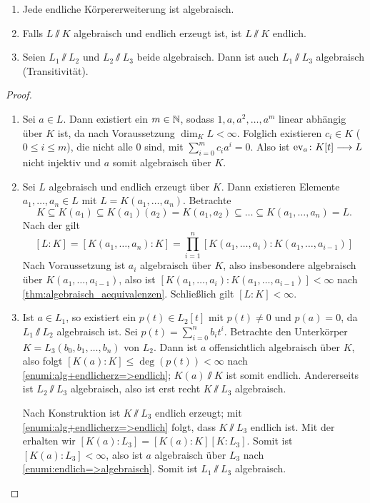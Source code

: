 \documentclass[12pt,a4paper]{scrartcl}
\begin{document}
\begin{satz}\label{thm:algebraischekes}
	\leavevmode
	\begin{enumerate}
		\item Jede endliche Körpererweiterung ist algebraisch.\label{enumi:endlich=>algebraisch}
		\item Falls $L\sslash K$ algebraisch und endlich erzeugt ist, ist $L\sslash K$ endlich.\label{enumi:alg+endlicherz=>endlich}
		\item Seien $L_1\sslash L_2$ und $L_2\sslash L_3$ beide algebraisch. Dann ist auch $L_1\sslash L_3$ algebraisch \textup(Transitivität\textup).
	\end{enumerate}
\end{satz}
\begin{proof}
	\leavevmode
	\begin{enumerate}
		\item Sei $a\in L$. Dann existiert ein $m\in \mathbb N$, sodass $1, a, a^2, \dots, a^m$ linear abhängig über $K$ ist, da nach Voraussetzung $\dim_KL<\infty$. Folglich existieren $c_i\in K$ ($0\leq i \leq m$), die nicht alle $0$ sind, mit
		$\sum_{i=0}^mc_ia^i = 0$. Also ist $\operatorname{ev}_a\colon K[t]\longrightarrow L$ nicht injektiv und $a$ somit algebraisch über $K$.
		\item Sei $L$ algebraisch und endlich erzeugt über $K$. Dann existieren Elemente $a_1,\dots, a_n\in L$ mit $L = K(a_1,\dots, a_n)$. Betrachte \[K \subseteq K(a_1) \subseteq K(a_1)(a_2) = K(a_1,a_2)\subseteq \dots \subseteq K(a_1,\dots, a_n) = L.\] Nach der  gilt $$[L:K] = [K(a_1,\dots, a_n):K] = \prod_{i = 1}^{n}[K(a_1, \dots, a_i):K(a_1,\dots, a_{i-1})]$$
		Nach Voraussetzung ist $a_i$ algebraisch über $K$, also insbesondere algebraisch über $K(a_1,\dots, a_{i-1})$, also ist $[K(a_1,\dots, a_i): K(a_1,\dots , a_{i-1})] < \infty$ nach \cref{thm:algebraisch_aequivalenzen}. Schließlich gilt $[L:K]< \infty$.
		\item Ist $a\in L_1$, so existiert ein $p(t)\in L_2[t]$ mit $p(t)\neq 0$ und $p(a) = 0$, da $L_1\sslash L_2$ algebraisch ist. Sei $p(t) = \sum_{i=0}^nb_it^i$. Betrachte den Unterkörper $K = L_3(b_0,b_1,\dots, b_n)$ von $L_2$. Dann ist $a$ offensichtlich algebraisch über $K$, also folgt $[K(a):K] \leq \deg(p(t)) <\infty$ nach \ref{enumi:alg+endlicherz=>endlich}; $K(a)\sslash K$ ist somit endlich. Andererseits ist $L_2\sslash L_3$ algebraisch, also ist erst recht $K\sslash L_3$ algebraisch.
		
		Nach Konstruktion ist $K\sslash L_3$ endlich erzeugt; mit \ref{enumi:alg+endlicherz=>endlich} folgt, dass $K\sslash L_3$ endlich ist. Mit der  erhalten wir $[K(a):L_3] = [K(a):K][K:L_3]$. Somit ist $[K(a):L_3] <\infty$, also ist $a$ algebraisch über $L_3$ nach \ref{enumi:endlich=>algebraisch}. Somit ist $L_1 \sslash L_3$ algebraisch.
  \qedhere
	\end{enumerate}
\end{proof}
\end{document}
